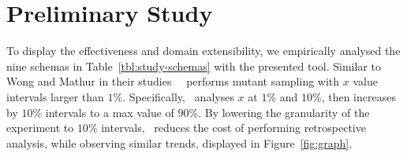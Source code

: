 \section{Preliminary Study}


To display the effectiveness and domain extensibility, we empirically analysed the nine schemas in Table~\ref{tbl:study-schemas}
with the presented tool.
Similar to Wong and Mathur in their studies~\cite{mathur1994empirical} \mr~performs mutant sampling with $x$ value intervals
larger than $1\%$.  Specifically, \mr~analyses $x$ at $1\%$ and  $10\%$, then increases by $10\%$ intervals to a max value of $90\%$.
By lowering the granularity of the experiment to $10\%$ intervals, \mr~reduces the cost of performing retrospective analysis, while observing
similar trends, displayed in Figure~\ref{fig:graph}.







